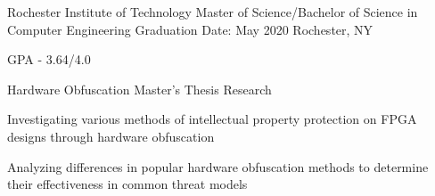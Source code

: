 
\begin{cventries}
  \cvexperience
	{Rochester Institute of Technology}
	{Master of Science/Bachelor of Science in Computer Engineering}
    {Graduation Date: May 2020}
    {Rochester, NY}
    {
      \begin{cvitems}
	  \item {GPA - 3.64/4.0}
      \end{cvitems}
    }

  \cvexperience
  {Hardware Obfuscation}
	{Master's Thesis Research}
    {}
    {}
    {
		\begin{cvitems}
		\item Investigating various methods of intellectual property protection on FPGA designs through hardware obfuscation
		\item Analyzing differences in popular hardware obfuscation methods to determine their effectiveness in common threat models
		\end{cvitems}
    }

\end{cventries}
